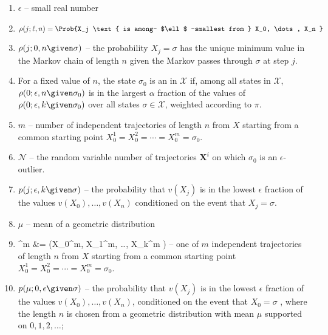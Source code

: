 \documentclass[12pt]{article}
\begin{document}
\begin{enumerate}
    \item
        \( \epsilon \) -- small real number
    \item
        \[
            \rho(j; \ell, n) = \Prob{X_j \text{ is among- $\ell$
            -smallest from } X_0, \dots, X_n }
        \]
    \item
        \( \rho(j; 0, n \given \sigma) \) -- the probability \( X_j =
        \sigma \) has the unique minimum value in the Markov chain of
        length \( n \) given the Markov passes through \( \sigma \) at
        step \( j \).
      \item     For a fixed value of \( n \), the state \( \sigma_0 \) is an  in \( \mathcal{X} \) if, among all
    states in \( \mathcal{X} \), \( \rho(0; \epsilon, n \given \sigma_{0})
    \) is in the largest \( \alpha \) fraction of the values of \( \rho(0;
    \epsilon, k \given \sigma_{0}) \) over all states \( \sigma \in
    \mathcal{X} \), weighted according to \( \pi \).
  \item \( m \) -- number of independent trajectories of length \( n \) from \(
            X \) starting from a common starting point \( X_0^1 =
            X_0^2 = \cdots = X_0^m = \sigma_0 \). 
          \item \( \mathcal{N} \) -- the random variable
            number of trajectories \( \mathbf{X}^i \) on which \( \sigma_0
            \) is an \( \epsilon \)-outlier.
          \item \( p(j; \epsilon,k \given \sigma) \) -- the probability that
\( v(X_j) \) is in the lowest \( \epsilon \) fraction of the values \(
v(X_0), \dots, v(X_n) \) conditioned on the event that \( X_j = \sigma
\).
\item $\mu$ -- mean of a geometric distribution
   \item
     ^m &= (X_0^m, X_1^m, \dots, X_k^m ) -- one of
     \( m \) independent trajectories of length \( n \) from \(
            X \) starting from a common starting point \( X_0^1 =
            X_0^2 = \cdots = X_0^m = \sigma_0 \). 
          \item $p(\mu; 0, \epsilon \given \sigma)$
 -- 
the probability that $v(X_j)$ is in the lowest $\epsilon$ fraction of the values
$v(X_0), \dots, v(X_n)$, conditioned on the event that $X_0 = σ$ , where
the length $n$ is chosen from a geometric distribution with mean $\mu$
supported on $0,1,2,\dots$;
\end{enumerate}
\end{document}
